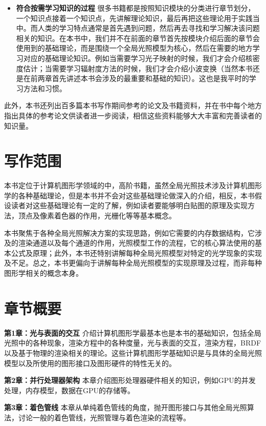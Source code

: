 \begin{itemize}
	\item \textbf{符合按需学习知识的过程 } 很多书籍都是按照知识模块的分类进行章节划分，一个知识点接着一个知识点，先讲解理论知识，最后再把这些理论用于实践当中。而人类的学习特点通常是首先遇到问题，然后再去寻找和学习解决该问题相关的知识。在本书中，我们并不在前面的章节首先按模块介绍后面的章节会使用到的基础理论，而是围绕一个全局光照模型为核心，然后在需要的地方学习对应的基础理论知识。例如当需要学习光子映射的时候，我们才会介绍核密度估计；当需要学习辐射度方法的时候，我们才会介绍小波变换（当然本书还是在前两章首先讲述本书会涉及的最重要和基础的知识）。这也是我平时的学习方法和习惯。
\end{itemize}

此外，本书还列出百多篇本书写作期间参考的论文及书籍资料，并在书中每个地方指出具体的参考论文供读者进一步阅读，相信这些资料能够大大丰富和完善读者的知识量。



\section*{写作范围}
本书定位于计算机图形学领域的中，高阶书籍，虽然全局光照技术涉及计算机图形学的各种基础理论，但是本书并不会对这些基础理论做深入的介绍，相反，本书假设读者对这些基础理论有一定的了解，例如读者要能够明白贴图的原理及实现方法，顶点及像素着色器的作用，光栅化等等基本概念。

本书聚焦于各种全局光照解决方案的实现思路，例如它需要的内存数据结构，它涉及的渲染通道以及每个通道的作用，光照模型工作的流程，它的核心算法使用的基本公式及原理；此外，本书还特别讲解每种全局光照模型对特定的光学现象的实现及不足。总之，本书更偏向于讲解每种全局光照模型的实现原理及过程，而非每种图形学相关的概念本身。




\section*{章节概要}
\textbf{第1章：光与表面的交互 } 介绍计算机图形学最基本也是本书的基础知识，包括全局光照中的各种现象，渲染方程中的各种度量，光与表面的交互，渲染方程，BRDF以及基于物理的渲染相关的理论。这些计算机图形学基础知识是与具体的全局光照模型以及所使用的图形接口及图形硬件的特性无关的。

\textbf{第2章：并行处理器架构 } 本章介绍图形处理器硬件相关的知识，例如GPU的并发处理，内存模型，数据在GPU的存储等。

\textbf{第3章：着色管线 } 本章从单纯着色管线的角度，抛开图形接口与其他全局光照算法，讨论一般的着色管线，光照管理与着色渲染的流程等。

